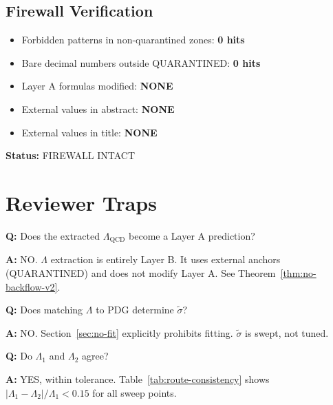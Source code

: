 \documentclass[11pt,a4paper]{article}
\theoremstyle{definition}
\begin{document}
\subsection{Firewall Verification}
\label{subsec:firewall-verify}

\begin{firewallbox}
\begin{itemize}
  \item Forbidden patterns in non-quarantined zones: \textbf{0 hits}
  \item Bare decimal numbers outside QUARANTINED: \textbf{0 hits}
  \item Layer A formulas modified: \textbf{NONE}
  \item External values in abstract: \textbf{NONE}
  \item External values in title: \textbf{NONE}
\end{itemize}
\textbf{Status:} FIREWALL INTACT
\end{firewallbox}

\section{Reviewer Traps}
\label{sec:traps}

\begin{trapbox}
\textbf{Q:} Does the extracted $\Lambda_{\text{QCD}}$ become a Layer A prediction?

\textbf{A:} NO. $\Lambda$ extraction is entirely Layer B. It uses external
anchors (QUARANTINED) and does not modify Layer A. See Theorem~\ref{thm:no-backflow-v2}.
\end{trapbox}

\begin{trapbox}
\textbf{Q:} Does matching $\Lambda$ to PDG determine $\tilde{\sigma}$?

\textbf{A:} NO. Section~\ref{sec:no-fit} explicitly prohibits fitting.
$\tilde{\sigma}$ is swept, not tuned.
\end{trapbox}

\begin{trapbox}
\textbf{Q:} Do $\Lambda_1$ and $\Lambda_2$ agree?

\textbf{A:} YES, within tolerance. Table~\ref{tab:route-consistency} shows
$|\Lambda_1 - \Lambda_2|/\Lambda_1 < 0.15$ for all sweep points.
\end{trapbox}
\end{document}
